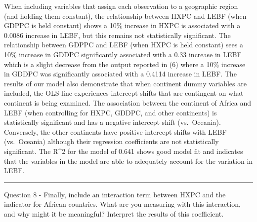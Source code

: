 \documentclass[
]{article}
\begin{document}
When including variables that assign each observation to a geographic
region (and holding them constant), the relationship between HXPC and
LEBF (when GDPPC is held constant) shows a 10\% increase in HXPC is
associated with a 0.0086 increase in LEBF, but this remains not
statistically significant. The relationship between GDPPC and LEBF (when
HXPC is held constant) sees a 10\% increase in GDDPC significantly
associated with a 0.33 increase in LEBF which is a slight decrease from
the output reported in (6) where a 10\% increase in GDDPC was
significantly associated with a 0.4114 increase in LEBF. The results of
our model also demonstrate that when continent dummy variables are
included, the OLS line experiences intercept shifts that are contingent
on what continent is being examined. The association between the
continent of Africa and LEBF (when controlling for HXPC, GDDPC, and
other continents) is statistically significant and has a negative
intercept shift (vs.~Oceania). Conversely, the other continents have
positive intercept shifts with LEBF (vs.~Oceania) although their
regression coefficients are not statistically significant. The R\^{}2
for the model of 0.641 shows good model fit and indicates that the
variables in the model are able to adequately account for the variation
in LEBF.

\begin{center}\rule{0.5\linewidth}{0.5pt}\end{center}

Question 8 - Finally, include an interaction term between HXPC and the
indicator for African countries. What are you measuring with this
interaction, and why might it be meaningful? Interpret the results of
this coefficient.
\end{document}
